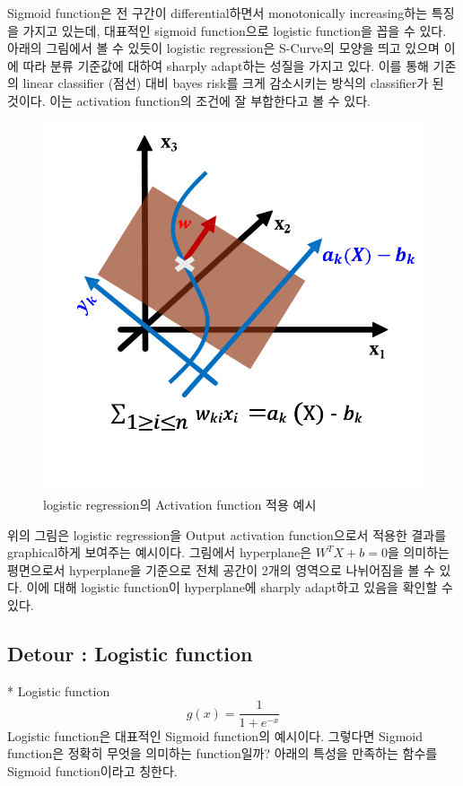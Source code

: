 \documentclass[draft=false]{oblivoir}
\begin{document}
Sigmoid function은 전 구간이 differential하면서 monotonically increasing하는 특징을 가지고 있는데, 대표적인 sigmoid function으로 logistic function을 꼽을 수 있다. 아래의 그림에서 볼 수 있듯이 logistic regression은 S-Curve의 모양을 띄고 있으며 이에 따라 분류 기준값에 대하여 sharply adapt하는 성질을 가지고 있다. 이를 통해 기존의 linear classifier (점선) 대비 bayes risk를 크게 감소시키는 방식의 classifier가 된 것이다. 이는 activation function의 조건에 잘 부합한다고 볼 수 있다. 
\begin{figure}[ht] \centering 
\includegraphics[scale=0.5]{fig14_5.png} 
\caption{logistic regression의 Activation function 적용 예시}
\label{fig:14-5}
\end{figure}
위의 그림은 logistic regression을 Output activation function으로서 적용한 결과를 graphical하게 보여주는 예시이다. 그림에서 hyperplane은 $W^{T}X+b=0$을 의미하는 평면으로서 hyperplane을 기준으로 전체 공간이 2개의 영역으로 나뉘어짐을 볼 수 있다. 이에 대해 logistic function이 hyperplane에 sharply adapt하고 있음을 확인할 수 있다. 
\subsection{Detour : Logistic function}

* Logistic function
\begin{equation}
g(x) = \frac{1}{1+e^{-x}}
\end{equation}
Logistic function은 대표적인 Sigmoid function의 예시이다. 그렇다면 Sigmoid function은 정확히 무엇을 의미하는 function일까? 아래의 특성을 만족하는 함수를 Sigmoid function이라고 칭한다.
\end{document}
